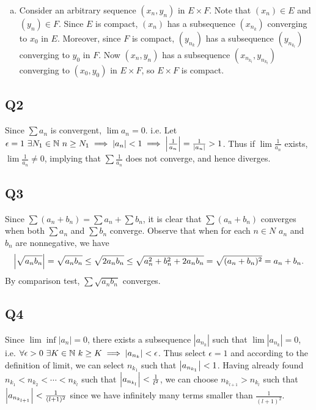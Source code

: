 \documentclass[12pt,lettersize]{article}
\newcommand{\N}{\mathbb{N}}
\begin{document}
\begin{enumerate}[(a)]
		\item Consider an arbitrary sequence $(x_n,y_n)$ in $E\times F$. Note that $(x_n)\in E$ and $(y_n)\in F$. Since $E$ is compact, $(x_n)$ has a subsequence $(x_{n_k})$ converging to $x_0$ in $E$. Moreover, since $F$ is compact, $(y_{n_k})$ has a subsequence $(y_{n_{k_l}})$ converging to $y_0$ in $F$. Now $(x_n,y_n)$ has a subsequence $(x_{n_{k_l}},y_{n_{k_l}})$ converging to $(x_0,y_0)$ in $E\times F$, so $E\times F$ is compact.
	\end{enumerate}
	\newpage
	
	\subsection*{Q2}
	Since $\sum a_n$ is convergent, $\lim a_n=0$. i.e. Let $\epsilon=1\ \exists N_1\in\N\ n\geq N_1\implies |a_n|<1\implies \abs{\frac{1}{a_n}}=\frac{1}{|a_n|}>1$. Thus if $\lim\frac{1}{a_n}$ exists, $\lim\frac{1}{a_n}\neq 0$, implying that $\sum \frac{1}{a_n}$ does not converge, and hence diverges.
	\newpage
	
	\subsection*{Q3}
	Since $\sum(a_n+b_n)=\sum a_n+\sum b_n$, it is clear that $\sum(a_n+b_n)$ converges when both $\sum a_n$ and $\sum b_n$ converge. Observe that when for each $n\in N$ $a_n$ and $b_n$ are nonnegative, we have
	\begin{align*}
		\abs{\sqrt{a_nb_n}}=\sqrt{a_nb_n}\leq\sqrt{2a_nb_n}\leq\sqrt{a_n^2+b_n^2+2a_nb_n}=\sqrt{(a_n+b_n)^2}=a_n+b_n.
	\end{align*}
	By comparison test, $\sum\sqrt{a_nb_n}$ converges.
	\newpage
	
	\subsection*{Q4}
	Since $\lim\inf|a_n|=0$, there exists a subsequence $|a_{n_k}|$ such that $\lim|a_{n_k}|=0$, i.e. $\forall\epsilon>0\ \exists K\in\N\ k\geq K\implies \abs{a_{n_k}}<\epsilon$. Thus select $\epsilon=1$ and according to the definition of limit, we can select $n_{k_1}$ such that $\abs{a_{n_{k_1}}}<1$. Having already found $n_{k_1}<n_{k_2}<\cdots<n_{k_l}$ such that $\abs{a_{n_{k_l}}}<\frac{1}{l^2}$, we can choose $n_{k_{l+1}}>n_{k_l}$ such that $\abs{a_{n_{k_{l+1}}}}<\frac{1}{(l+1)^2}$ since we have infinitely many terms smaller than $\frac{1}{(l+1)^2}$.\smallskip
	
\end{document}
